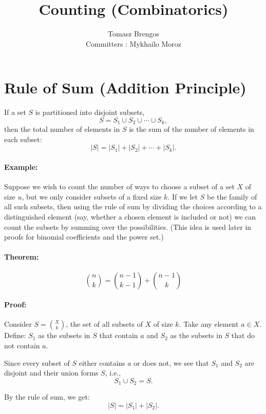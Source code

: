 


\title{Counting (Combinatorics)}
\author{Tomasz Brengos \\  
Committers : Mykhailo Moroz}

\maketitle

\section{Rule of Sum (Addition Principle)}
If a set $S$ is partitioned into disjoint subsets,
\[
S = S_1 \cup S_2 \cup \cdots \cup S_k,
\]
then the total number of elements in $S$ is the sum of the number of elements in each subset:
\[
|S| = |S_1| + |S_2| + \cdots + |S_k|.
\]

\paragraph{Example:}  
Suppose we wish to count the number of ways to choose a subset of a set $X$ of size $u$, but we only consider subsets of a fixed size $k$. If we let $S$ be the family of all such subsets, then using the rule of sum by dividing the choices according to a distinguished element (say, whether a chosen element is included or not) we can count the subsets by summing over the possibilities. (This idea is used later in proofs for binomial coefficients and the power set.)

\paragraph{Theorem:}
\[
\binom{n}{k} = \binom{n-1}{k-1} + \binom{n-1}{k}
\]

\paragraph{Proof:}
Consider \( S = \binom{X}{k} \), the set of all subsets of \( X \) of size \( k \).  
Take any element \( a \in X \). Define:  
 \( S_1 \) as the subsets in \( S \) that contain \( a \) and  
 \( S_2 \) as the subsets in \( S \) that do not contain \( a \).  

Since every subset of \( S \) either contains \( a \) or does not, we see that \( S_1 \) and \( S_2 \) are disjoint and their union forms \( S \), i.e.,  
\[
S_1 \cup S_2 = S.
\]

By the rule of sum, we get:  
\[
|S| = |S_1| + |S_2|.
\]

